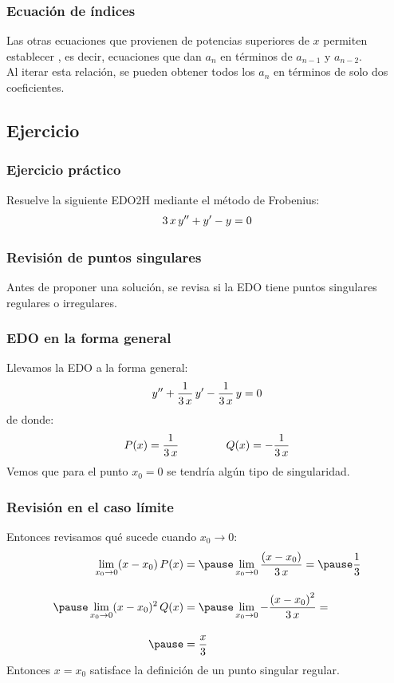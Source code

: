 \documentclass[12pt]{beamer}
\begin{document}
\begin{frame}
\frametitle{Ecuación de índices}
Las otras ecuaciones que provienen de potencias superiores de $x$ permiten establecer , es decir, ecuaciones que dan $a_{n}$ en términos de $a_{n-1}$ y $a_{n-2}$.
\\
\bigskip
\pause
Al iterar esta relación, se pueden obtener todos los $a_{n}$ en términos de solo dos coeficientes.
\end{frame}

\subsection{Ejercicio}

\begin{frame}
\frametitle{Ejercicio práctico}
Resuelve la siguiente EDO2H mediante el método de Frobenius:
\pause
\begin{align}
3 \, x \, {y}^{\prime \prime} + {y}^{\prime} - y = 0
\label{eq:ecuacion_04}    
\end{align}
\end{frame}
\begin{frame}
\frametitle{Revisión de puntos singulares}
Antes de proponer una solución, se revisa si la EDO tiene puntos singulares regulares o irregulares.
\end{frame}
\begin{frame}
\frametitle{EDO en la forma general}
Llevamos la EDO a la forma general:
\begin{align*}
    {y}^{\prime \prime} + \dfrac{1}{3 \, x} \, {y}^{\prime} - \dfrac{1}{3 \, x} \, y = 0
\end{align*}
\pause
de donde:
\pause
\begin{align*}
    P (x) = \dfrac{1}{3 \, x} \hspace{1.5cm} Q (x) = -\dfrac{1}{3 \, x}
\end{align*}
Vemos que para el punto $x_{0} = 0$ se tendría algún tipo de singularidad.
\end{frame}
\begin{frame}
\frametitle{Revisión en el caso límite}
Entonces revisamos qué sucede cuando $x_{0} \to 0$:
\pause
\begin{eqnarray*}
\begin{aligned}
    \lim_{x_{0} \to 0} (x - x_{0}) \, P (x) &= \pause \lim_{x_{0} \to 0} \dfrac{ \left( x - x_{0} \right)}{3 \, x} = \pause \dfrac{1}{3} \\[1em] \pause
    \lim_{x_{0} \to 0} (x - x_{0})^{2} \, Q (x) &= \pause \lim_{x_{0} \to 0} - \dfrac{\left( x - x_{0} \right)^{2}}{3 \, x} = \\[1em] \pause
    &= \dfrac{x}{3} 
\end{aligned}
\end{eqnarray*}
\pause
Entonces $x = x_{0}$ satisface la definición de un punto singular regular.
\end{frame}
\end{document}

